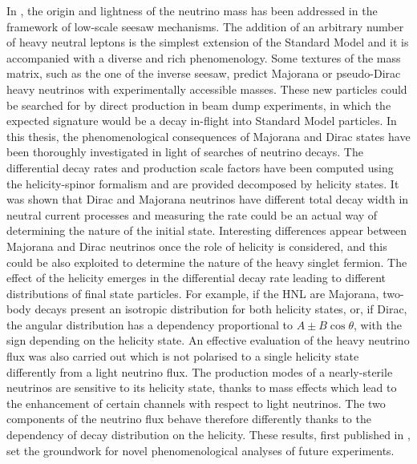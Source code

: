 In , the origin and lightness of the neutrino mass has been addressed %
in the framework of low-scale seesaw mechanisms.
The addition of an arbitrary number of heavy neutral leptons is the simplest extension of the Standard Model %
and it is accompanied with a diverse and rich phenomenology.
Some textures of the mass matrix, such as the one of the inverse seesaw, %
predict Majorana or pseudo-Dirac heavy neutrinos with experimentally accessible masses.
These new particles could be searched for by direct production in beam dump experiments, %
in which the expected signature would be a decay in-flight into Standard Model particles.
In this thesis, the phenomenological consequences of Majorana and Dirac states have been thoroughly investigated %
in light of searches of neutrino decays.
The differential decay rates and production scale factors have been computed using %
the helicity-spinor formalism and are provided decomposed by helicity states.
It was shown that Dirac and Majorana neutrinos have different total decay width in neutral current processes %
and measuring the rate could be an actual way of determining the nature of the initial state.
Interesting differences appear between Majorana and Dirac neutrinos once the role of helicity is considered, %
and this could be also exploited to determine the nature of the heavy singlet fermion.
The effect of the helicity emerges in the differential decay rate leading to different %
distributions of final state particles. %
For example, if the HNL are Majorana, two-body decays present an isotropic distribution for both helicity states, %
or, if Dirac, the angular distribution has a dependency proportional to $A\pm B \cos\theta$, %
with the sign depending on the helicity state.
An effective evaluation of the heavy neutrino flux was also carried out %
which is not polarised to a single helicity state differently from a light neutrino flux.
The production modes of a nearly-sterile neutrinos are sensitive to its helicity state, %
thanks to mass effects which lead to the enhancement of certain channels with respect to light neutrinos.
The two components of the neutrino flux behave therefore differently thanks to the dependency of decay distribution on the helicity.
These results, first published in , set the groundwork for novel phenomenological analyses %
of future experiments.

